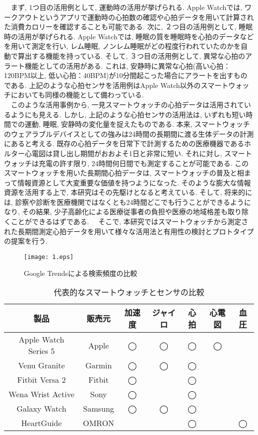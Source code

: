 \documentclass[report, 11pt, a4paper]{jsbook}
\begin{document}
　まず, 1つ目の活用例として, 運動時の活用が挙げられる. Apple Watchでは, ワークアウトというアプリで運動時の心拍数の確認や心拍データを用いて計算された消費カロリーを確認することも可能である. 次に, ２つ目の活用例として, 睡眠時の活用が挙げられる. Apple Watchでは, 睡眠の質を睡眠時を心拍のデータなどを用いて測定を行い, レム睡眠, ノンレム睡眠がどの程度行われていたのかを自動で算出する機能を持っている. そして, ３つ目の活用例として, 異常な心拍のアラート機能としての活用がある. これは, 安静時に異常な心拍(高い心拍：120BPM以上, 低い心拍：40BPM)が10分間起こった場合にアラートを出すものである\cite{func}. 上記のような心拍センサを活用例はApple Watch以外のスマートウォッチにおいても同様の機能として備わっている. \\
　このような活用事例から, 一見スマートウォッチの心拍データは活用されているようにも見える. しかし, 上記のような心拍センサの活用法は, いずれも短い時間での運動, 睡眠, 安静時の変化量を捉えたものである. 本来, スマートウォッチのウェアラブルデバイスとしての強みは24時間の長期間に渡る生体データの計測にあると考える. 既存の心拍データを日常下で計測するための医療機器であるホルター心電図は貸し出し期間がおおよそ1日と非常に短い. それに対し, スマートウォッチは充電の許す限り, 24時間何日間でも測定することが可能である. このスマートウォッチを用いた長期間心拍データは, スマートウォッチの普及と相まって情報資源として大変重要な価値を持つようになった. そのような膨大な情報資源を活用する上で, 本研究はその先駆けとなると考えている. そして, 将来的には, 診察や診断を医療機関ではなくとも24時間どこでも行うことができるようになり, その結果, 少子高齢化による医療従事者の負担や医療の地域格差も取り除くことができるはずである.
　そこで, 本研究ではスマートウォッチから測定された長期間測定心拍データを用いて様々な活用法と有用性の検討とプロトタイプの提案を行う.  

\begin{figure}[H]
\centering
\texttt{[image: 1.eps]}
\caption{Google Trendsによる検索頻度の比較}
\label{fig:goolge_trends}
\end{figure}

\begin{table}[H]
\centering
\caption{代表的なスマートウォッチとセンサの比較}
\begin{tabular}{ccccccc}
\hline
製品                   & 販売元     & 加速度 & ジャイロ & 心拍 & 心電図 & 血圧 \\ \hline
Apple Watch Series 5 & Apple   & ◯   & ◯    & ◯  & ◯   &    \\
Venu Granite         & Garmin  & ◯   & ◯    & ◯  &     &    \\
Fitbit Versa 2       & Fitbit  & ◯   &      & ◯  &     &    \\
Wena Wrist Active    & Sony    & ◯   &      & ◯  &     &    \\
Galaxy Watch         & Samsung & ◯   & ◯    & ◯  &     &    \\
HeartGuide           & OMRON   &     &      & ◯  &     & ◯  \\ \hline
\end{tabular}
\end{table}
　
\end{document}
